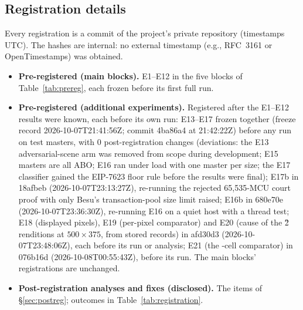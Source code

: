 \documentclass[10pt]{article}
\begin{document}
\subsection{Registration details}
Every registration is a commit of the project's private repository (timestamps UTC). The hashes are internal: no
external timestamp (e.g., RFC~3161 or OpenTimestamps) was obtained.
\begin{itemize}
\item \textbf{Pre-registered (main blocks).} E1--E12 in the five blocks of Table~\ref{tab:prereg}, each frozen before
its first full run.
\item \textbf{Pre-registered (additional experiments).} Registered after the E1--E12 results were known, each before
its own run: E13--E17 frozen together (freeze record 2026-10-07T21:41:56Z; commit 4ba86a4 at 21:42:22Z) before any run on test masters, with 0
post-registration changes (deviations: the E13 adversarial-scene arm was removed from scope during development; E15
masters are all ABO; E16 ran under load with one master per size; the E17 classifier gained the EIP-7623 floor rule
before the results were final); E17b in 18afbeb (2026-10-07T23:13:27Z), re-running the rejected 65,535-MCU court proof
with only Besu's transaction-pool size limit raised; E16b in 680e70e (2026-10-07T23:36:30Z), re-running E16 on a quiet
host with a thread test; E18 (displayed pixels), E19 (per-pixel comparator) and E20 (cause of the \G{2} renditions at
$500\times375$, from stored records) in afd30d3 (2026-10-07T23:48:06Z), each before its run or analysis; E21 (the \Eone{}-cell comparator) in 076b16d
(2026-10-08T00:55:43Z), before its run. The main
blocks' registrations are unchanged.
\item \textbf{Post-registration analyses and fixes (disclosed).} The items of \S\ref{sec:postreg}; outcomes in Table~\ref{tab:registration}.
\end{itemize}
\end{document}

